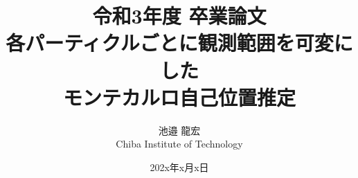 \documentclass[a4paper,11pt]{jsbook}
\begin{document}
\title{令和3年度 卒業論文\\
各パーティクルごとに観測範囲を可変にした\\モンテカルロ自己位置推定}

\author{池邉 龍宏 \\
Chiba Institute of Technology}

\date{202x年x月x日}

\maketitle



\tableofcontents



\cleardoublepage
{}
 











\newpage
\printindex
\end{document}
